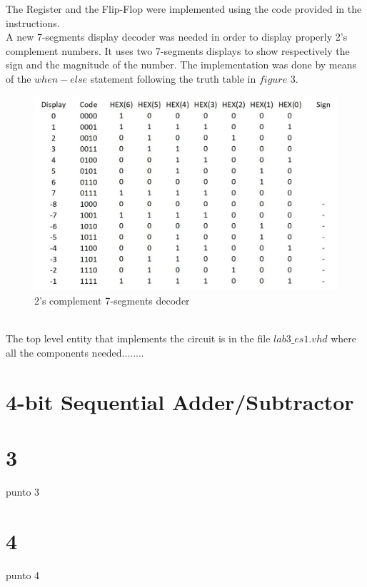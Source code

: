 \documentclass[12pt]{article}
\begin{document}
The Register and the Flip-Flop were implemented using the code provided in the instructions.\\
A new 7-segments display decoder was needed in order to display properly 2's complement numbers. It uses two 7-segments displays to show respectively the sign and the magnitude of the number. The implementation was done by means of the $when-else$ statement following the truth table in $figure$ $3$.
\begin{figure}[h]
	\centering
	\includegraphics[scale = 0.7]{immagini/B3.jpg}
	\caption{2's complement 7-segments decoder}
\end{figure}\\
The top level entity that implements the circuit is in the file $lab3\_es1.vhd$ where all the components needed........





\section{4-bit Sequential Adder/Subtractor}

	


\section{3}
punto 3


\section{4}
punto 4
\end{document}
